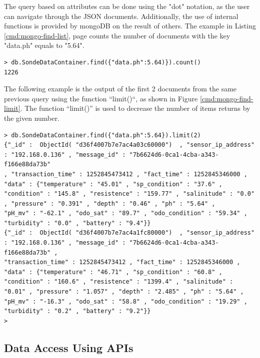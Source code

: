 The query based on attributes can be done using the "dot" notation, as the user
can navigate through the JSON documents. Additionally, the use of internal
functions is provided by mongoDB on the result of others. The example in
Listing \ref{cmd:mongo-find-list}, page \pageref{cmd:mongo-find-list} counts
the number of documents with the key "data.ph" equals to "5.64".

\lstset{label=cmd:mongo-find-list,caption=Execution of mongo client}
\begin{lstlisting}
> db.SondeDataContainer.find({"data.ph":5.64)}).count()
1226
\end{lstlisting}

The following example is the output of the first 2 documents from the same
previous query using the function ``limit()``, as shown in Figure
\ref{cmd:mongo-find-limit}. The function ``limit()'' is used to decrease the
number of items returns by the given number.

\lstset{label=cmd:mongo-find-limit,caption=Query Element with specific
projection limiting the result set size}
\begin{lstlisting}
> db.SondeDataContainer.find({"data.ph":5.64}).limit(2)
{"_id" :  ObjectId( "d36f4007b7e7ac4a03c60000")  , "sensor_ip_address" : "192.168.0.136" , "message_id" : "7b6624d6-0ca1-4cba-a343-f166e88da73b"
, "transaction_time" : 1252845473412 , "fact_time" : 1252845346000 , "data" : {"temperature" : "45.01" , "sp_condition" : "37.6" ,
"condition" : "145.8" , "resistence" : "159.77" , "salinitude" : "0.0" , "pressure" : "0.391" , "depth" : "0.46" , "ph" : "5.64" ,
"pH_mv" : "-62.1" , "odo_sat" : "89.7" , "odo_condition" : "59.34" , "turbidity" : "0.0" , "battery" : "9.4"}}
{"_id" :  ObjectId( "d36f4007b7e7ac4a1fc80000")  , "sensor_ip_address" : "192.168.0.136" , "message_id" : "7b6624d6-0ca1-4cba-a343-f166e88da73b" ,
"transaction_time" : 1252845473412 , "fact_time" : 1252845346000 , "data" : {"temperature" : "46.71" , "sp_condition" : "60.8" ,
"condition" : "160.6" , "resistence" : "1399.4" , "salinitude" : "0.01" , "pressure" : "1.057" , "depth" : "2.485" , "ph" : "5.64" ,
"pH_mv" : "-16.3" , "odo_sat" : "58.8" , "odo_condition" : "19.29" , "turbidity" : "0.2" , "battery" : "9.2"}}
>
\end{lstlisting}

\subsection{Data Access Using APIs}
\label{sec:dsp-mongodb-rest-ws}

